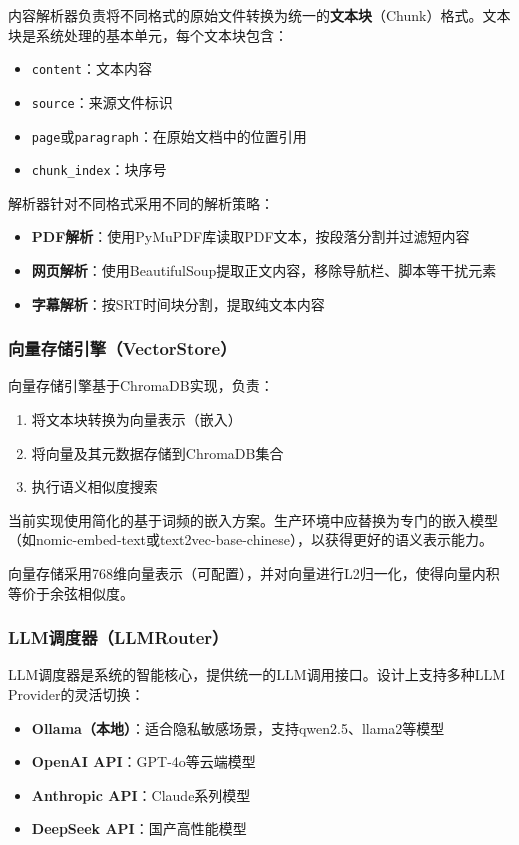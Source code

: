 \documentclass[12pt,a4paper,oneside]{article}
\newcommand{\code}[1]{\texttt{#1}}
\begin{document}
内容解析器负责将不同格式的原始文件转换为统一的\textbf{文本块}（Chunk）格式。文本块是系统处理的基本单元，每个文本块包含：
\begin{itemize}
    \item \code{content}：文本内容
    \item \code{source}：来源文件标识
    \item \code{page}或\code{paragraph}：在原始文档中的位置引用
    \item \code{chunk\_index}：块序号
\end{itemize}

解析器针对不同格式采用不同的解析策略：
\begin{itemize}
    \item \textbf{PDF解析}：使用PyMuPDF库读取PDF文本，按段落分割并过滤短内容
    \item \textbf{网页解析}：使用BeautifulSoup提取正文内容，移除导航栏、脚本等干扰元素
    \item \textbf{字幕解析}：按SRT时间块分割，提取纯文本内容
\end{itemize}

\subsubsection{向量存储引擎（VectorStore）}

向量存储引擎基于ChromaDB实现，负责：
\begin{enumerate}[\arabic*)]
    \item 将文本块转换为向量表示（嵌入）
    \item 将向量及其元数据存储到ChromaDB集合
    \item 执行语义相似度搜索
\end{enumerate}

当前实现使用简化的基于词频的嵌入方案。生产环境中应替换为专门的嵌入模型（如nomic-embed-text或text2vec-base-chinese），以获得更好的语义表示能力。

向量存储采用768维向量表示（可配置），并对向量进行L2归一化，使得向量内积等价于余弦相似度。

\subsubsection{LLM调度器（LLMRouter）}

LLM调度器是系统的智能核心，提供统一的LLM调用接口。设计上支持多种LLM Provider的灵活切换：

\begin{itemize}
    \item \textbf{Ollama（本地）}：适合隐私敏感场景，支持qwen2.5、llama2等模型
    \item \textbf{OpenAI API}：GPT-4o等云端模型
    \item \textbf{Anthropic API}：Claude系列模型
    \item \textbf{DeepSeek API}：国产高性能模型
\end{itemize}
\end{document}
